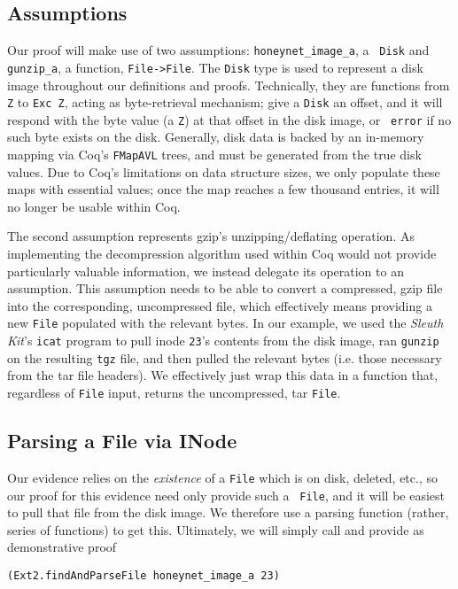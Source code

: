 \documentclass[nocopyrightspace]{sigplanconf}
\begin{document}
\subsection{Assumptions}
Our proof will make use of two assumptions: {\tt honeynet\_image\_a}, a {\tt
Disk} and {\tt gunzip\_a}, a function, {\tt File->File}. The {\tt Disk} type
is used to represent a disk image throughout our definitions and proofs.
Technically, they are functions from {\tt Z} to {\tt Exc Z}, acting as
byte-retrieval mechanism; give a {\tt Disk} an offset, and it will respond
with the byte value (a {\tt Z}) at that offset in the disk image, or {\tt
error} if no such byte exists on the disk. Generally, disk data is backed by
an in-memory mapping via Coq's {\tt FMapAVL} trees, and must be generated from
the true disk values. Due to Coq's limitations on data structure sizes, we
only populate these maps with essential values; once the map reaches a few
thousand entries, it will no longer be usable within Coq.

The second assumption represents gzip's unzipping/deflating operation. As
implementing the decompression algorithm used within Coq would not provide
particularly valuable information, we instead delegate its operation to an
assumption. This assumption needs to be able to convert a compressed, gzip
file into the corresponding, uncompressed file, which effectively means
providing a new {\tt File} populated with the relevant bytes. In our example,
we used the {\it Sleuth Kit}'s {\tt icat} program to pull inode {\tt 23}'s
contents from the disk image, ran {\tt gunzip} on the resulting {\tt tgz}
file, and then pulled the relevant bytes (i.e. those necessary from the tar
file headers). We effectively just wrap this data in a function that,
regardless of {\tt File} input, returns the uncompressed, tar {\tt File}.


\subsection{Parsing a File via INode}

Our evidence relies on the {\it existence} of a {\tt File} which is on disk,
deleted, etc., so our proof for this evidence need only provide such a {\tt
File}, and it will be easiest to pull that file from the disk image. We
therefore use a parsing function (rather, series of functions) to get this.
Ultimately, we will simply call and provide as demonstrative proof

\begin{lstlisting}
(Ext2.findAndParseFile honeynet_image_a 23)
\end{lstlisting}
\end{document}
